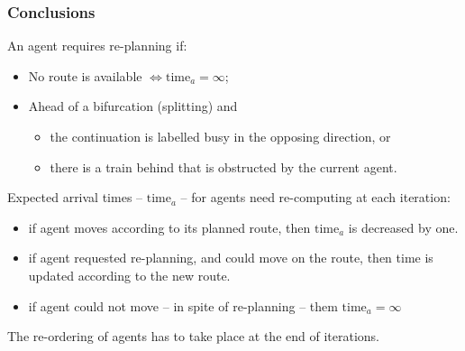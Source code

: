 \documentclass[12pt,aspectratio=169]{beamer}
\begin{document}
\begin{frame}[fragile,t]
  \frametitle{Conclusions}

An agent requires re-planning if:
\begin{itemize}
\item No route is available $\Leftrightarrow \mathrm{time}_a=\infty$;
\item Ahead of a bifurcation (splitting) and
  \begin{itemize}
  \item the continuation is labelled busy in the opposing direction, \alert{or}
  \item there is a train behind that is obstructed  by the current agent.
  \end{itemize}

\end{itemize}

\vfill

\alert{Expected arrival times} -- $\mathrm{time}_{a}$ -- for agents need re-computing at \alert{each iteration}:
\begin{itemize}
\item if agent moves according to its planned route, then $\mathrm{time}_{a}$ is decreased by \alert{one}.
\item if agent requested re-planning, and could move on the route, then time is updated according to the new route.
\item if agent could not move -- in spite of re-planning -- them $\mathrm{time}_{a}=\infty$
\end{itemize}

\vfill

\begin{block}{}
\alert{The re-ordering} of agents has to take place at the end of iterations.
\end{block}

\end{frame}
\end{document}
